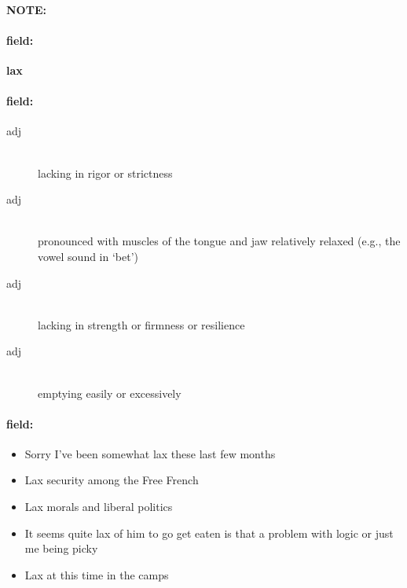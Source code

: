 \documentclass[12pt]{article}
\newenvironment{note}{\paragraph{NOTE:}}{}
\newenvironment{field}{\paragraph{field:}}{}
\begin{document}
\begin{note}
\begin{field}
\textbf{\large lax}
\end{field}


\begin{field}
\begin{description}
\item[adj] \hfill \\ 
lacking in rigor or strictness

\item[adj] \hfill \\ 
pronounced with muscles of the tongue and jaw relatively relaxed (e.g., the vowel sound in `bet')

\item[adj] \hfill \\ 
lacking in strength or firmness or resilience

\item[adj] \hfill \\ 
emptying easily or excessively

\end{description}
\end{field}

\begin{field}
\begin{itemize}
\item Sorry I've been somewhat lax these last few months
\item Lax security among the Free French
\item Lax morals and liberal politics
\item It seems quite lax of him to go get eaten  is that a problem with logic or just me being picky
\item Lax at this time in the camps
\end{itemize}
\end{field}
\end{note}
\end{document}
